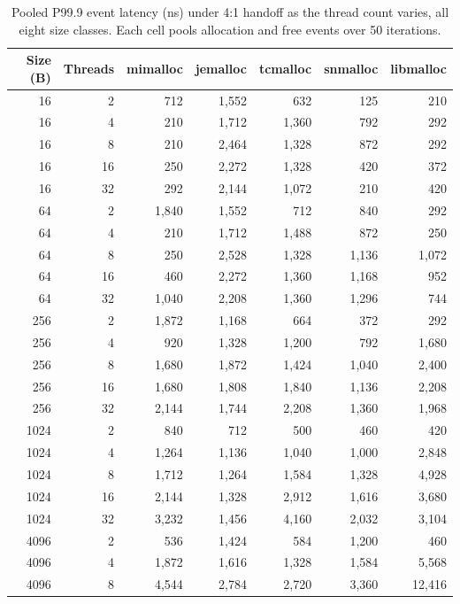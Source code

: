 \begin{table}[!htbp]
\centering
\scriptsize
\setlength{\tabcolsep}{3pt}
\caption{Pooled P99.9 event latency (ns) under 4:1 handoff as the thread count varies, all eight size classes. Each cell pools allocation and free events over 50 iterations.}
\label{tab:scaling-4to1}
\begin{tabular}{rrrrrrr}
\toprule
Size (B) & Threads & mimalloc & jemalloc & tcmalloc & snmalloc & libmalloc\\
\midrule
16 & 2 & 712 & 1{,}552 & 632 & 125 & 210 \\
16 & 4 & 210 & 1{,}712 & 1{,}360 & 792 & 292 \\
16 & 8 & 210 & 2{,}464 & 1{,}328 & 872 & 292 \\
16 & 16 & 250 & 2{,}272 & 1{,}328 & 420 & 372 \\
16 & 32 & 292 & 2{,}144 & 1{,}072 & 210 & 420 \\
64 & 2 & 1{,}840 & 1{,}552 & 712 & 840 & 292 \\
64 & 4 & 210 & 1{,}712 & 1{,}488 & 872 & 250 \\
64 & 8 & 250 & 2{,}528 & 1{,}328 & 1{,}136 & 1{,}072 \\
64 & 16 & 460 & 2{,}272 & 1{,}360 & 1{,}168 & 952 \\
64 & 32 & 1{,}040 & 2{,}208 & 1{,}360 & 1{,}296 & 744 \\
256 & 2 & 1{,}872 & 1{,}168 & 664 & 372 & 292 \\
256 & 4 & 920 & 1{,}328 & 1{,}200 & 792 & 1{,}680 \\
256 & 8 & 1{,}680 & 1{,}872 & 1{,}424 & 1{,}040 & 2{,}400 \\
256 & 16 & 1{,}680 & 1{,}808 & 1{,}840 & 1{,}136 & 2{,}208 \\
256 & 32 & 2{,}144 & 1{,}744 & 2{,}208 & 1{,}360 & 1{,}968 \\
1024 & 2 & 840 & 712 & 500 & 460 & 420 \\
1024 & 4 & 1{,}264 & 1{,}136 & 1{,}040 & 1{,}000 & 2{,}848 \\
1024 & 8 & 1{,}712 & 1{,}264 & 1{,}584 & 1{,}328 & 4{,}928 \\
1024 & 16 & 2{,}144 & 1{,}328 & 2{,}912 & 1{,}616 & 3{,}680 \\
1024 & 32 & 3{,}232 & 1{,}456 & 4{,}160 & 2{,}032 & 3{,}104 \\
4096 & 2 & 536 & 1{,}424 & 584 & 1{,}200 & 460 \\
4096 & 4 & 1{,}872 & 1{,}616 & 1{,}328 & 1{,}584 & 5{,}568 \\
4096 & 8 & 4{,}544 & 2{,}784 & 2{,}720 & 3{,}360 & 12{,}416 \\

\end{tabular}
\end{table}

